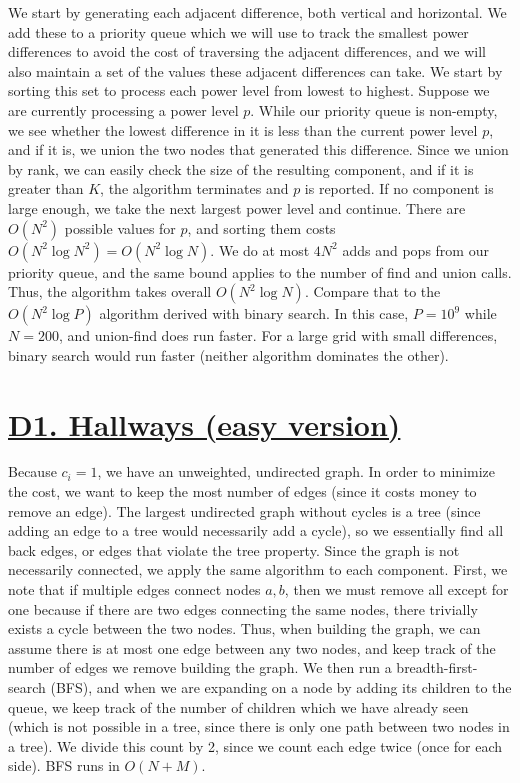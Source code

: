 \documentclass[11pt, oneside]{article}
\theoremstyle{plain}
\theoremstyle{definition}
\begin{document}
We start by generating each adjacent difference, both vertical and horizontal.
We add these to a priority queue which we will use to track the smallest power
differences to avoid the cost of traversing the adjacent differences, and
we will also maintain a set of the values these adjacent differences can take.
We start by sorting this set to process each power level from lowest to highest.
Suppose we are currently processing a power level \( p \).
While our priority queue is non-empty, we see whether the lowest
difference in it is less than the current power level \( p \), and if it is,
we union the two nodes that generated this difference.
Since we union by rank, we can easily check the
size of the resulting component, and if it is greater than \( K \),
the algorithm terminates and \( p \) is reported.
If no component is large enough, we take the next largest power level
and continue. There are \( O(N^2) \) possible values for \( p \),
and sorting them costs \( O(N^2 \log N^2) = O(N^2 \log N) \).
We do at most \( 4N^2 \) adds and pops from our priority queue,
and the same bound applies to the number of find and union calls.
Thus, the algorithm takes overall \( O(N^2 \log N) \).
Compare that to the \( O(N^2 \log P) \) algorithm derived with binary search.
In this case, \( P = 10^9 \) while \( N = 200 \), and union-find does run 
faster. For a large grid with small differences, binary search would run faster
(neither algorithm dominates the other).

\section{\href{https://codeforces.com/group/M4wsRWBHyZ/contest/299371/problem/D1}
{D1. Hallways (easy version)}}
Because \( c_i = 1 \), we have an unweighted, undirected graph.
In order to minimize the cost, we want to keep the most number of edges
(since it costs money to remove an edge).
The largest undirected graph without cycles is a tree (since adding an edge to
a tree would necessarily add a cycle), so we essentially find all back edges,
or edges that violate the tree property. Since the graph is not necessarily
connected, we apply the same algorithm to each component.
First, we note that if multiple edges connect nodes \( a, b \), then we must
remove all except for one because if there are two edges connecting the same
nodes, there trivially exists a cycle between the two nodes.
Thus, when building the graph, we can assume there is at most one edge between
any two nodes, and keep track of the number of edges we remove building
the graph. We then run a breadth-first-search (BFS), and when we are expanding
on a node by adding its children to the queue, we keep track of the number of
children which we have already seen (which is not possible in a tree, since
there is only one path between two nodes in a tree).
We divide this count by 2, since we count each edge twice (once for each side).
BFS runs in \( O(N + M) \). 
\end{document}
